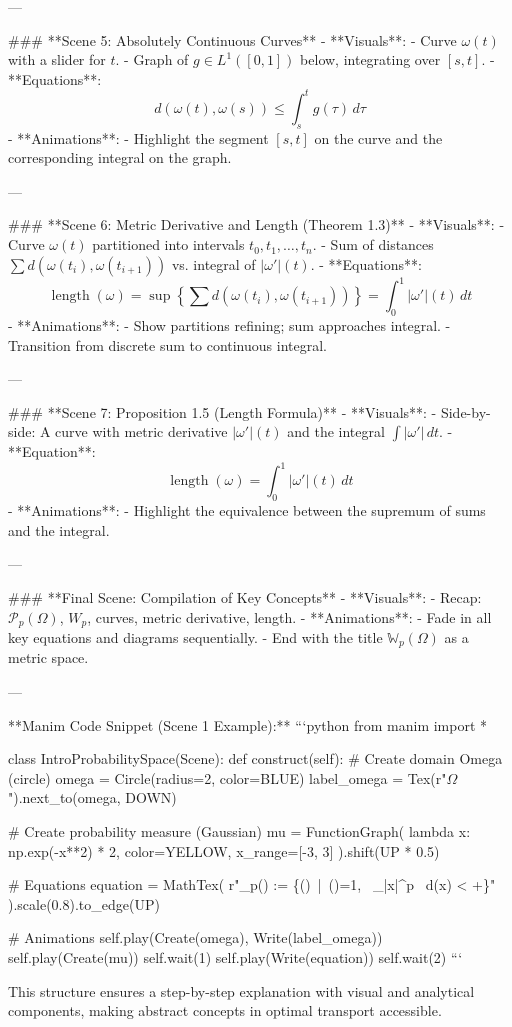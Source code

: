 ---

### **Scene 5: Absolutely Continuous Curves**
- **Visuals**:
  - Curve \(\omega(t)\) with a slider for \(t\).
  - Graph of \(g \in L^1([0,1])\) below, integrating over \([s, t]\).
- **Equations**:
  \[
  d(\omega(t), \omega(s)) \leq \int_s^t g(\tau) \, d\tau
  \]
- **Animations**:
  - Highlight the segment \([s, t]\) on the curve and the corresponding integral on the graph.

---

### **Scene 6: Metric Derivative and Length (Theorem 1.3)**
- **Visuals**:
  - Curve \(\omega(t)\) partitioned into intervals \(t_0, t_1, \dots, t_n\).
  - Sum of distances \(\sum d(\omega(t_i), \omega(t_{i+1}))\) vs. integral of \(|\omega'|(t)\).
- **Equations**:
  \[
  \operatorname{length}(\omega) = \sup \left\{\sum d(\omega(t_i), \omega(t_{i+1}))\right\} = \int_0^1 |\omega'|(t) \, dt
  \]
- **Animations**:
  - Show partitions refining; sum approaches integral.
  - Transition from discrete sum to continuous integral.

---

### **Scene 7: Proposition 1.5 (Length Formula)**
- **Visuals**:
  - Side-by-side: A curve with metric derivative \(|\omega'|(t)\) and the integral \(\int |\omega'| \, dt\).
- **Equation**:
  \[
  \operatorname{length}(\omega) = \int_0^1 |\omega'|(t) \, dt
  \]
- **Animations**:
  - Highlight the equivalence between the supremum of sums and the integral.

---

### **Final Scene: Compilation of Key Concepts**
- **Visuals**:
  - Recap: \(\mathcal{P}_p(\Omega)\), \(W_p\), curves, metric derivative, length.
- **Animations**:
  - Fade in all key equations and diagrams sequentially.
  - End with the title \(\mathbb{W}_p(\Omega)\) as a metric space.

---

**Manim Code Snippet (Scene 1 Example):**
```python
from manim import *

class IntroProbabilitySpace(Scene):
    def construct(self):
        # Create domain Omega (circle)
        omega = Circle(radius=2, color=BLUE)
        label_omega = Tex(r"$\Omega$").next_to(omega, DOWN)

        # Create probability measure (Gaussian)
        mu = FunctionGraph(
            lambda x: np.exp(-x**2) * 2,
            color=YELLOW,
            x_range=[-3, 3]
        ).shift(UP * 0.5)

        # Equations
        equation = MathTex(
            r"_p(\Omega) := \left\{\mu \in {}(\Omega) \,\bigg|\, \mu(\Omega)=1, \, \int_{\Omega}|x|^p \, d\mu(x) < +\infty \right\}"
        ).scale(0.8).to_edge(UP)

        # Animations
        self.play(Create(omega), Write(label_omega))
        self.play(Create(mu))
        self.wait(1)
        self.play(Write(equation))
        self.wait(2)
```

This structure ensures a step-by-step explanation with visual and analytical components, making abstract concepts in optimal transport accessible.